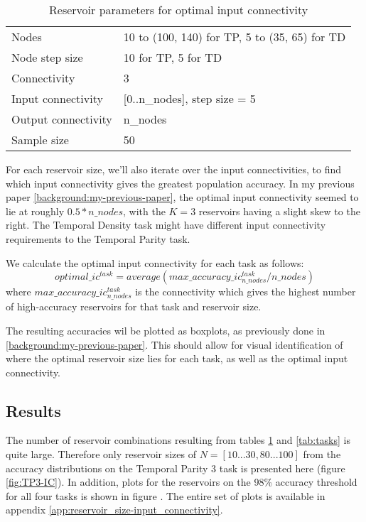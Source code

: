 \begin{table}[ht]
    \centering
    \caption{Reservoir parameters for optimal input connectivity}
    \label{tab:ic-reservoir-parameters}
    \begin{tabular}{ll}
        Nodes               & 10 to (100, 140) for TP, 5 to (35, 65) for TD \\
        Node step size      & 10 for TP, 5 for TD \\
        Connectivity        & 3                              \\
        Input connectivity  & [0..n\_nodes], step size = 5   \\
		Output connectivity & n\_nodes                       \\
        Sample size         & 50
    \end{tabular}
\end{table}

For each reservoir size, we'll also iterate over the input connectivities,
to find which input connectivity gives the greatest population accuracy.
In my previous paper \ref{background:my-previous-paper},
the optimal input connectivity seemed to lie at roughly $ 0.5*n\_nodes $,
with the $K=3$ reservoirs having a slight skew to the right.
The Temporal Density task might have different input connectivity requirements to the Temporal Parity task.

We calculate the optimal input connectivity for each task as follows:
\begin{equation} \label{eq:optimal-ic}
optimal\_ic^{task} = average(max\_accuracy\_ic_{n\_nodes}^{task} / n\_nodes)
\end{equation}
where $ max\_accuracy\_ic_{n\_nodes}^{task} $ is the connectivity which gives the highest number of high-accuracy reservoirs for that task and reservoir size.

The resulting accuracies wil be plotted as boxplots, as previously done in \ref{background:my-previous-paper}.
This should allow for visual identification of where the optimal reservoir size lies for each task,
as well as the optimal input connectivity.

\subsection{Results}

The number of reservoir combinations resulting from tables \ref{tab:ic-reservoir-parameters} and \ref{tab:tasks} is quite large.
Therefore only reservoir sizes of $ N=[10...30, 80...100]$ from the accuracy distributions on the Temporal Parity 3 task is presented here (figure \ref{fig:TP3-IC}).
In addition, plots for the reservoirs on the 98\% accuracy threshold for all four tasks is shown in figure \label{fig:accuracy-threshold-size}.
The entire set of plots is available in appendix \ref{app:reservoir_size-input_connectivity}.


